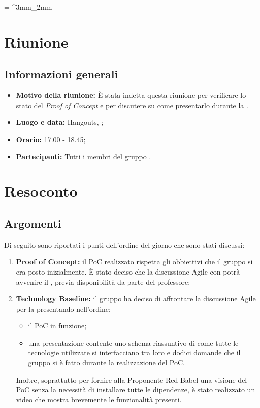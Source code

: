\documentclass[VER-2018-03-02.tex]{subfiles}
\begin{document}
\tabulinesep = ^3mm_2mm
\chapter{Riunione}
\section{Informazioni generali}
\begin{itemize}
	\item \textbf{Motivo della riunione:} \`{E} stata indetta questa riunione per verificare lo stato del \textit{Proof of Concept} e per discutere su come presentarlo durante la \tb.
	\item \textbf{Luogo e data:} Hangouts, ;
	\item \textbf{Orario:} 17.00 - 18.45;
	\item \textbf{Partecipanti:} Tutti i membri del gruppo \gruppo.
\end{itemize}


\chapter{Resoconto}

\section{Argomenti}
Di seguito sono riportati i punti dell'ordine del giorno che sono stati discussi:
\begin{enumerate}
	\item \textbf{Proof of Concept:} il PoC realizzato rispetta gli obbiettivi che il gruppo si era posto inizialmente. \`{E} stato deciso che la discussione Agile con \Cardin potrà avvenire il , previa disponibilità da parte del professore;
	\item \textbf{Technology Baseline:} il gruppo ha deciso di affrontare la discussione Agile per la \tb presentando nell'ordine:
	\begin{itemize}
		\item il PoC in funzione;
		\item una presentazione contente uno schema riassuntivo di come tutte le tecnologie utilizzate si interfacciano tra loro e dodici domande che il gruppo si è fatto durante la realizzazione del PoC.
	\end{itemize}
	 Inoltre, soprattutto per fornire alla Proponente Red Babel una visione del PoC senza la necessità di installare tutte le dipendenze, è stato realizzato un video che mostra brevemente le funzionalità presenti.
\end{enumerate}
\end{document}
